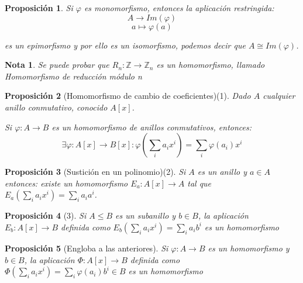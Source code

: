 \documentclass[11pt, a4paper, titlepage]{article}
\providecommand{\ent}{\mathbb{Z}}
\theoremstyle{theorem-style}
\newtheorem*{nprop}{Proposición}
\theoremstyle{definition-style}
\theoremstyle{remark-style}
\newtheorem*{nota}{Nota}
\theoremstyle{example-style}
\begin{document}
\begin{nprop}
	Si $\varphi$ es monomorfismo, entonces la aplicación restringida:
\[
A \to Im(\varphi)\]
\[
a \mapsto \varphi(a)
\]

es un epimorfismo y por ello es un isomorfismo, podemos decir que $A \cong Im(\varphi)$.\\
\end{nprop}


\begin{nota}
	Se puede probar que $R_n: \ent \to \ent_n$ es un homomorfismo, llamado \emph{Homomorfismo de reducción módulo n}\\
\end{nota}


\begin{nprop}[Homomorfismo de cambio de coeficientes)(1]
 Dado $A$ cualquier anillo conmutativo, conocido $A[x]$.
 
 Si $\varphi:A \to B$ es un homomorfismo de anillos conmutativos, entonces:
 \[
 \exists \varphi: A[x] \to B[x] : \varphi\left(\sum_i a_i x^i\right) = \sum_i\varphi(a_i) x^i
 \]

	
\end{nprop}

\begin{nprop}[Sustición en un polinomio)(2]
	
Si $A$ es un anillo y $a \in A$ entonces: existe un homomorfismo $E_a: A[x] \to A$ tal que $E_a(\sum_i a_i x^i) = \sum_i a_i a^i$.
	
\end{nprop}

\begin{nprop}[3]
Si $A \leq B$ es un subanillo y $b\in B$, la aplicación $E_b:A[x] \to B$ definida como $E_b(\sum_i a_i x^i) = \sum_i a_i b^i$ es un homomorfismo
	
\end{nprop}

\begin{nprop}[Engloba a las anteriores]
Si $\varphi:A \to B$ es un homomorfismo y $b\in B$, la aplicación $\Phi:A[x] \to B$ definida como $\Phi ( \sum_i a_i x^i) = \sum_i \varphi(a_i)b^i \in B$ es un homomorfismo 

\end{nprop}
\end{document}
